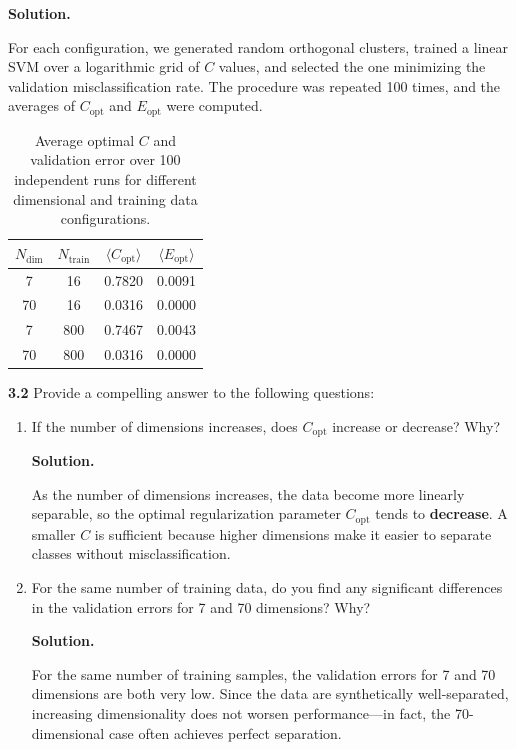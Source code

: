 \documentclass[11pt]{article}
\begin{document}
\begin{enumerate}
		\medskip
		\noindent\textbf{Solution.}
		
		For each configuration, we generated random orthogonal clusters, trained a linear SVM over a logarithmic grid of $C$ values, and selected the one minimizing the validation misclassification rate. The procedure was repeated 100 times, and the averages of $C_{\text{opt}}$ and $E_{\text{opt}}$ were computed.
		
		\begin{table}[H]
			\centering
			\begin{tabular}{cccc}
				\toprule
				$N_{\text{dim}}$ & $N_{\text{train}}$ & $\langle C_{\text{opt}} \rangle$ & $\langle E_{\text{opt}} \rangle$ \\
				\midrule
				7  & 16  & 0.7820 & 0.0091 \\
				70 & 16  & 0.0316 & 0.0000 \\
				7  & 800 & 0.7467 & 0.0043 \\
				70 & 800 & 0.0316 & 0.0000 \\
				\bottomrule
			\end{tabular}
			\caption{Average optimal $C$ and validation error over 100 independent runs for different dimensional and training data configurations.}
		\end{table}
		
		\noindent\textbf{3.2} Provide a compelling answer to the following questions:
		
		\begin{enumerate}[label=\textbf{(\alph*)}]
			\item If the number of dimensions increases, does $C_{\text{opt}}$ increase or decrease? Why?
			
			\medskip
			\noindent\textbf{Solution.}
			
			As the number of dimensions increases, the data become more linearly separable, so the optimal regularization parameter $C_{\text{opt}}$ tends to \textbf{decrease}.  
			A smaller $C$ is sufficient because higher dimensions make it easier to separate classes without misclassification.
			
			\item For the same number of training data, do you find any significant differences in the validation errors for 7 and 70 dimensions? Why?		
			
			\medskip
			\noindent\textbf{Solution.}
			
			For the same number of training samples, the validation errors for 7 and 70 dimensions are both very low.  
			Since the data are synthetically well-separated, increasing dimensionality does not worsen performance—in fact, the 70-dimensional case often achieves perfect separation.
			
		\end{enumerate}
  
	\end{enumerate}
	\newpage
\end{document}

